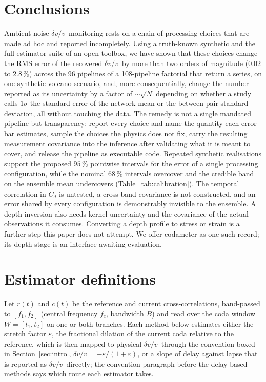 \documentclass[
  referee]{gji}
\providecommand{\dvv}{\ensuremath{\delta v/v}}
\begin{document}
\section{Conclusions}\label{sec:conclusions}

Ambient-noise \dvv~monitoring rests on a chain of processing choices
that are made ad hoc and reported incompletely. Using a truth-known
synthetic and the full estimator suite of an open toolbox, we have shown
that these choices change the RMS error of the recovered \dvv~by more
than two orders of magnitude (0.02 to \(2.8\,\%\)) across the 96
pipelines of a 108-pipeline factorial that return a series, on one
synthetic volcano scenario, and, more consequentially, change the number
reported as its uncertainty by a factor of \(\sim\!\sqrt{N}\) depending
on whether a study calls \(1\sigma\) the standard error of the network
mean or the between-pair standard deviation, all without touching the
data. The remedy is not a single mandated pipeline but transparency:
report every choice and name the quantity each error bar estimates,
sample the choices the physics does not fix, carry the resulting
measurement covariance into the inference after validating what it is
meant to cover, and release the pipeline as executable code. Repeated
synthetic realisations support the proposed \(95\,\%\) pointwise
intervals for the error of a single processing configuration, while the
nominal \(68\,\%\) intervals overcover and the credible band on the
ensemble mean undercovers (Table~\ref{tab:calibration}). The temporal
correlation in \(C_d\) is untested, a cross-band covariance is not
constructed, and an error shared by every configuration is demonstrably
invisible to the ensemble. A depth inversion also needs kernel
uncertainty and the covariance of the actual observations it consumes.
Converting a depth profile to stress or strain is a further step this
paper does not attempt. We offer codameter as one such record; its depth
stage is an interface awaiting evaluation.

\appendix

\section{Estimator definitions}\label{app:estimators}

Let \(r(t)\) and \(c(t)\) be the reference and current
cross-correlations, band-passed to \([f_1,f_2]\) (central frequency
\(f_c\), bandwidth \(B\)) and read over the coda window \(W=[t_1,t_2]\)
on one or both branches. Each method below estimates either the stretch
factor \(\varepsilon\), the fractional dilation of the current coda
relative to the reference, which is then mapped to physical \dvv~through
the convention boxed in Section~\ref{sec:intro},
\(\dvv=-\varepsilon/(1+\varepsilon)\), or a slope of delay against lapse
that is reported as \dvv~directly; the convention paragraph before the
delay-based methods says which route each estimator takes.
\end{document}

